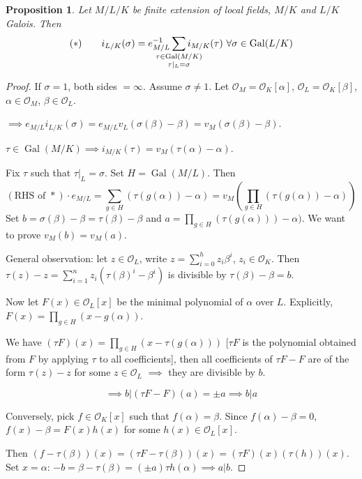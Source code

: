 \documentclass[a4paper]{article}
\newtheorem{prop}[definition]{Proposition}
\DeclareMathOperator{\Gal}{Gal}
\begin{document}
\begin{prop}
	Let $M/L/K$ be finite extension of local fields,
	$M/K$ and $L/K$ Galois.
	Then
	$$(*) \qquad i_{L/K}(\sigma) = e_{M/L}^{-1} \sum_{\mathclap{\substack{\tau \in \Gal(M/K) \\ \tau|_L = \sigma}}} i_{M/K}(\tau) \ \forall \sigma \in \Gal(L/K)$$
	\label{87}
\end{prop}
\begin{proof}
	If $\sigma = 1$, both sides $= \infty$. Assume $\sigma \neq 1$.
	Let $\mathcal{O}_M = \mathcal{O}_K[\alpha]$, 
	$\mathcal{O}_L = \mathcal{O}_K[\beta]$,
	$\alpha \in \mathcal{O}_M$, 
	$\beta \in \mathcal{O}_L$.
	
	$\implies e_{M/L}i_{L/K}(\sigma) = e_{M/L} v_L(\sigma(\beta)-\beta) = v_M(\sigma(\beta)-\beta)$.
	
	$\tau \in \Gal(M/K) \implies i_{M/K}(\tau) = v_M(\tau(\alpha) - \alpha)$.
	
	Fix $\tau$ such that $\tau|_L = \sigma$.
	Set $H = \Gal(M/L)$. Then
	$$(\text{RHS of } *)\cdot e_{M/L} = \sum_{g \in H}(\tau(g(\alpha)) - \alpha) = v_M(\prod_{g \in H}(\tau(g(\alpha)) - \alpha))$$
	Set $b=\sigma(\beta)-\beta = \tau(\beta) - \beta$
	and $a = \prod_{g \in H}(\tau(g(\alpha))) - \alpha)$.
	We want to prove $v_M(b) = v_M(a)$.
	
	General observation:
	let $z \in \mathcal{O}_L$,
	write $z = \sum_{i=0}^h z_i \beta^i$, $z_i \in \mathcal{O}_K$.
	Then $\tau(z)-z = \sum_{i=1}^n z_i(\tau(\beta)^i-\beta^i)$ is divisible by $\tau(\beta)-\beta = b$.
	
	Now let $F(x) \in \mathcal{O}_L[x]$ be the minimal polynomial of $\alpha$ over $L$.
	Explicitly, $F(x) = \prod_{g \in H}(x - g(\alpha))$.
	
	We have $(\tau F)(x) = \prod_{g \in H}(x - \tau(g(\alpha)))$
	[$\tau F$ is the polynomial obtained from $F$ by applying $\tau$ to all coefficients],
	then all coefficients of $\tau F - F$ are of the form $\tau(z) - z$ for some $z \in \mathcal{O}_L$
	$\implies$ they are divisible by $b$.
	
	$$\implies b | (\tau F -F)(a) = \pm a \implies b | a$$
	
	Conversely, pick $f \in \mathcal{O}_K[x]$ such that $f(\alpha) = \beta$.
	Since $f(\alpha) - \beta = 0$,
	$f(x) - \beta = F(x)h(x)$ for some $h(x) \in \mathcal{O}_L[x]$.
	
	Then $(f-\tau(\beta))(x) = (\tau F - \tau(\beta))(x) = (\tau F)(x)(\tau(h))(x)$.
	Set $x = \alpha$: $-b = \beta - \tau(\beta) = (\pm a)\tau h(\alpha) \implies a | b$.
\end{proof}
\end{document}
